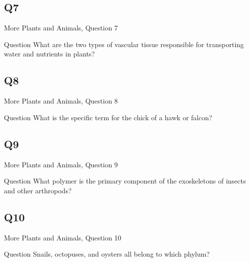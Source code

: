 \documentclass[11pt]{beamer}
\begin{document}
\subsection*{Q7}
\begin{frame}[t]{More Plants and Animals, Question 7}
\begin{block}{Question}
What are the two types of vascular tissue responsible for transporting water and nutrients in plants?
\end{block}
\end{frame}
\subsection*{Q8}
\begin{frame}[t]{More Plants and Animals, Question 8}
\begin{block}{Question}
What is the specific term for the chick of a hawk or falcon?
\end{block}
\end{frame}
\subsection*{Q9}
\begin{frame}[t]{More Plants and Animals, Question 9}
\begin{block}{Question}
What polymer is the primary component of the exoskeletons of insects and other arthropods?
\end{block}
\end{frame}
\subsection*{Q10}
\begin{frame}[t]{More Plants and Animals, Question 10}
\begin{block}{Question}
Snails, octopuses, and oysters all belong to which phylum?
\end{block}
\end{frame}
\end{document}
